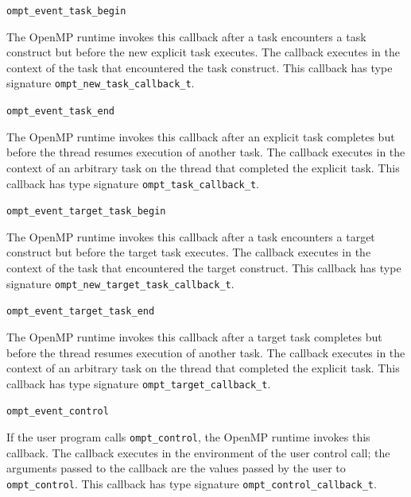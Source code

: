 \documentclass{article}
\newcommand{\descheader}[1]{{\needspace{3\baselineskip}\vspace{1em}\noindent \fbox{#1}}}
\begin{document}
\begin{description}

\item \verb|ompt_event_task_begin|
 
The OpenMP runtime invokes this callback
after a task encounters a task construct
but before the new explicit task 
executes. The callback executes in the context of
the task that encountered the task construct.
This callback has type signature \verb|ompt_new_task_callback_t|.

\item \verb|ompt_event_task_end|   
 
\sloppy
The OpenMP runtime invokes this callback
after an explicit task completes 
but before the thread resumes execution of another task.  
The callback executes in the context of an
arbitrary task on the thread that completed the explicit task.
This callback has type signature \verb|ompt_task_callback_t|. 

\item \verb|ompt_event_target_task_begin|
 
The OpenMP runtime invokes this callback after a task encounters a target 
construct but before the target task executes. The callback executes in the 
context of the task that encountered the target construct.
This callback has type signature \verb|ompt_new_target_task_callback_t|.

\item \verb|ompt_event_target_task_end|   
 
\sloppy
The OpenMP runtime invokes this callback after a target task completes but 
before the thread resumes execution of another task. The callback executes in 
the context of an arbitrary task on the thread that completed the explicit task.
This callback has type signature \verb|ompt_target_callback_t|. 

\end{description}


\descheader{Application Tool Control}

\begin{description}

\item \verb|ompt_event_control|

If the user program calls \verb|ompt_control|, the
OpenMP runtime invokes this callback.
The callback executes in the environment
of the user control call; the arguments passed to the callback are the values passed by the user to \verb|ompt_control|.
This callback has type signature \verb|ompt_control_callback_t|. 

\end{description}
\end{document}
